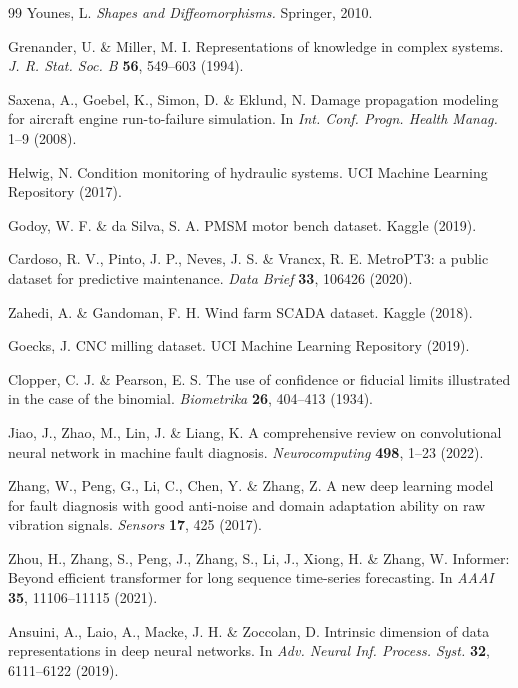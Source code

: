 \documentclass[11pt]{article}
\begin{document}
\begin{thebibliography}{99}
 Younes, L. \emph{Shapes and Diffeomorphisms.}
Springer, 2010.

 Grenander, U. \& Miller, M. I. Representations of
knowledge in complex systems. \emph{J. R. Stat. Soc. B} \textbf{56},
549--603 (1994).

 Saxena, A., Goebel, K., Simon, D. \& Eklund, N.
Damage propagation modeling for aircraft engine run-to-failure simulation.
In \emph{Int. Conf. Progn. Health Manag.} 1--9 (2008).

 Helwig, N. Condition monitoring of hydraulic systems.
UCI Machine Learning Repository (2017).

 Godoy, W. F. \& da Silva, S. A. PMSM motor bench dataset.
Kaggle (2019).

 Cardoso, R. V., Pinto, J. P., Neves, J. S. \& Vrancx,
R. E. MetroPT3: a public dataset for predictive maintenance.
\emph{Data Brief} \textbf{33}, 106426 (2020).

 Zahedi, A. \& Gandoman, F. H. Wind farm SCADA dataset.
Kaggle (2018).

 Goecks, J. CNC milling dataset. UCI Machine Learning
Repository (2019).

 Clopper, C. J. \& Pearson, E. S. The use of confidence
or fiducial limits illustrated in the case of the binomial.
\emph{Biometrika} \textbf{26}, 404--413 (1934).

 Jiao, J., Zhao, M., Lin, J. \& Liang, K. A comprehensive
review on convolutional neural network in machine fault diagnosis.
\emph{Neurocomputing} \textbf{498}, 1--23 (2022).

 Zhang, W., Peng, G., Li, C., Chen, Y. \& Zhang, Z. A
new deep learning model for fault diagnosis with good anti-noise and domain
adaptation ability on raw vibration signals. \emph{Sensors} \textbf{17},
425 (2017).

 Zhou, H., Zhang, S., Peng, J., Zhang, S., Li, J., Xiong,
H. \& Zhang, W. Informer: Beyond efficient transformer for long sequence
time-series forecasting. In \emph{AAAI} \textbf{35}, 11106--11115 (2021).

 Ansuini, A., Laio, A., Macke, J. H. \& Zoccolan, D.
Intrinsic dimension of data representations in deep neural networks. In
\emph{Adv. Neural Inf. Process. Syst.} \textbf{32}, 6111--6122 (2019).


\end{thebibliography}
\end{document}
